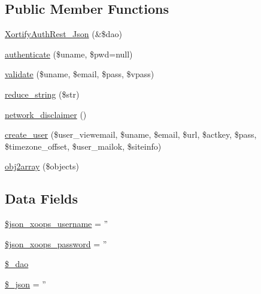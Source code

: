 \subsection*{Public Member Functions}
\begin{DoxyCompactItemize}
\item 
\hyperlink{class_xortify_auth_rest___json_a49655248be6ee9b8888388b9137f433c}{Xortify\-Auth\-Rest\-\_\-\-Json} (\&\$dao)
\item 
\hyperlink{class_xortify_auth_rest___json_a00678ba307326b734e6c679f28bea315}{authenticate} (\$uname, \$pwd=null)
\item 
\hyperlink{class_xortify_auth_rest___json_a91121a1b702dfd20fb65a027c8ed26ec}{validate} (\$uname, \$email, \$pass, \$vpass)
\item 
\hyperlink{class_xortify_auth_rest___json_ae463a3baa44e95fa5b5151ab2334df1c}{reduce\-\_\-string} (\$str)
\item 
\hyperlink{class_xortify_auth_rest___json_a1874c27b6f81a3f2ff9015405ad0f8bc}{network\-\_\-disclaimer} ()
\item 
\hyperlink{class_xortify_auth_rest___json_ac72efc5ad313a592cf6706876f56f7ec}{create\-\_\-user} (\$user\-\_\-viewemail, \$uname, \$email, \$url, \$actkey, \$pass, \$timezone\-\_\-offset, \$user\-\_\-mailok, \$siteinfo)
\item 
\hyperlink{class_xortify_auth_rest___json_aabc52e4f78557f0e0b360a8aaba6e11d}{obj2array} (\$objects)
\end{DoxyCompactItemize}
\subsection*{Data Fields}
\begin{DoxyCompactItemize}
\item 
\hyperlink{class_xortify_auth_rest___json_ac058687d82a56fb93513e7e58c4ec391}{\$json\-\_\-xoops\-\_\-username} = ''
\item 
\hyperlink{class_xortify_auth_rest___json_a7af311f07c1c09254920e6ac0cefe9a9}{\$json\-\_\-xoops\-\_\-password} = ''
\item 
\hyperlink{class_xortify_auth_rest___json_a12a029c610f699b4b25e79a1f64a3485}{\$\-\_\-dao}
\item 
\hyperlink{class_xortify_auth_rest___json_a94787b37d92a2dee02534eed4f316589}{\$\-\_\-json} = ''
\end{DoxyCompactItemize}


